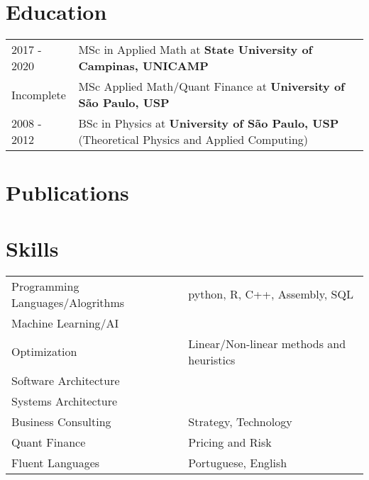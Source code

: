 \documentclass[a4paper,12pt]{article}
\begin{document}
\section{Education}
\begin{tabularx}{\linewidth}{@{}l X@{}}
2017 - 2020 & MSc in Applied Math at \textbf{State University of Campinas, UNICAMP} \\
Incomplete & MSc Applied Math/Quant Finance at \textbf{University of São Paulo, USP}  \\
2008 - 2012 & BSc in Physics at \textbf{University of São Paulo, USP} \hfill (Theoretical Physics and Applied Computing) \\
\end{tabularx}

\section{Publications}
\begin{refsection}
\nocite{*}
\printbibliography[heading=none]
\end{refsection}

\section{Skills}
\begin{tabularx}{\linewidth}{@{}l X@{}}
Programming Languages/Alogrithms &  \normalsize{python, R, C++, Assembly, SQL}\\
Machine Learning/AI &  \normalsize{}\\
Optimization &  \normalsize{Linear/Non-linear methods and heuristics}\\
Software Architecture &  \normalsize{}\\
Systems Architecture &  \normalsize{}\\
Business Consulting  &  \normalsize{Strategy, Technology}\\
Quant Finance &  \normalsize{Pricing and Risk}\\
Fluent Languages &  \normalsize{Portuguese, English}\\

\end{tabularx}

\vfill
{}
\end{document}
